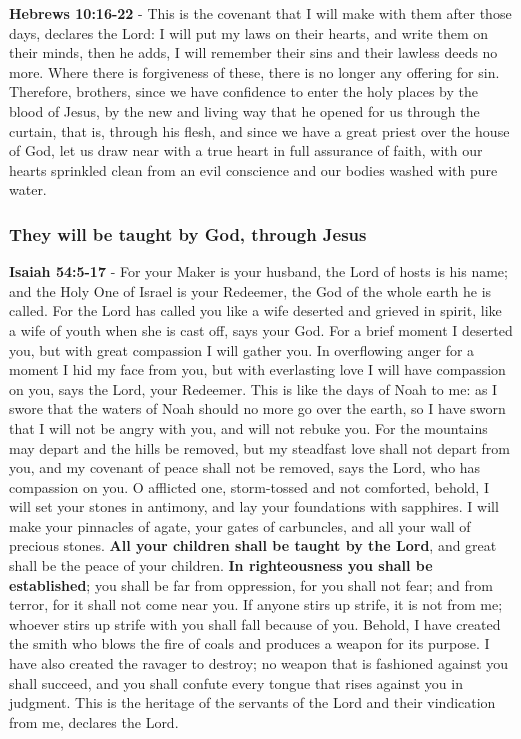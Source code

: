\documentclass[11pt]{article}
\begin{document}
\textbf{Hebrews 10:16-22} - This is the covenant that I will make with them after those days, declares the Lord: I will put my laws on their hearts, and write them on their minds, then he adds, I will remember their sins and their lawless deeds no more.  Where there is forgiveness of these, there is no longer any offering for sin.  Therefore, brothers, since we have confidence to enter the holy places by the blood of Jesus, by the new and living way that he opened for us through the curtain, that is, through his flesh, and since we have a great priest over the house of God, let us draw near with a true heart in full assurance of faith, with our hearts sprinkled clean from an evil conscience and our bodies washed with pure water.

\subsubsection{They will be taught by God, through Jesus}
\label{sec:org21a9f32}
\textbf{Isaiah 54:5-17} - For your Maker is your husband, the Lord of hosts is his name; and the Holy One of Israel is your Redeemer, the God of the whole earth he is called. For the Lord has called you like a wife deserted and grieved in spirit, like a wife of youth when she is cast off, says your God. For a brief moment I deserted you, but with great compassion I will gather you. In overflowing anger for a moment I hid my face from you, but with everlasting love I will have compassion on you, says the Lord, your Redeemer. This is like the days of Noah to me: as I swore that the waters of Noah should no more go over the earth, so I have sworn that I will not be angry with you, and will not rebuke you. For the mountains may depart and the hills be removed, but my steadfast love shall not depart from you, and my covenant of peace shall not be removed, says the Lord, who has compassion on you. O afflicted one, storm-tossed and not comforted, behold, I will set your stones in antimony, and lay your foundations with sapphires. I will make your pinnacles of agate, your gates of carbuncles, and all your wall of precious stones. \textbf{All your children shall be taught by the Lord}, and great shall be the peace of your children. \textbf{In righteousness you shall be established}; you shall be far from oppression, for you shall not fear; and from terror, for it shall not come near you. If anyone stirs up strife, it is not from me; whoever stirs up strife with you shall fall because of you. Behold, I have created the smith who blows the fire of coals and produces a weapon for its purpose. I have also created the ravager to destroy; no weapon that is fashioned against you shall succeed, and you shall confute every tongue that rises against you in judgment. This is the heritage of the servants of the Lord and their vindication from me, declares the Lord.
\end{document}
